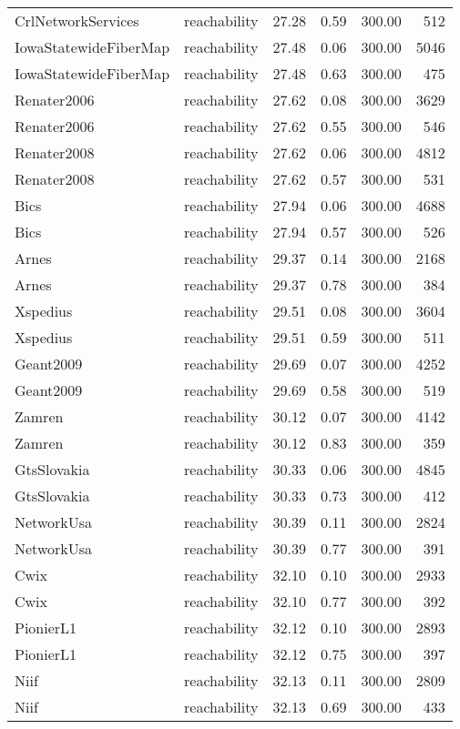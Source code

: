 \begin{tabular}{llrrrr}
CrlNetworkServices & reachability & 27.28 & 0.59 & 300.00 & 512 \\
IowaStatewideFiberMap & reachability & 27.48 & 0.06 & 300.00 & 5046 \\
IowaStatewideFiberMap & reachability & 27.48 & 0.63 & 300.00 & 475 \\
Renater2006 & reachability & 27.62 & 0.08 & 300.00 & 3629 \\
Renater2006 & reachability & 27.62 & 0.55 & 300.00 & 546 \\
Renater2008 & reachability & 27.62 & 0.06 & 300.00 & 4812 \\
Renater2008 & reachability & 27.62 & 0.57 & 300.00 & 531 \\
Bics & reachability & 27.94 & 0.06 & 300.00 & 4688 \\
Bics & reachability & 27.94 & 0.57 & 300.00 & 526 \\
Arnes & reachability & 29.37 & 0.14 & 300.00 & 2168 \\
Arnes & reachability & 29.37 & 0.78 & 300.00 & 384 \\
Xspedius & reachability & 29.51 & 0.08 & 300.00 & 3604 \\
Xspedius & reachability & 29.51 & 0.59 & 300.00 & 511 \\
Geant2009 & reachability & 29.69 & 0.07 & 300.00 & 4252 \\
Geant2009 & reachability & 29.69 & 0.58 & 300.00 & 519 \\
Zamren & reachability & 30.12 & 0.07 & 300.00 & 4142 \\
Zamren & reachability & 30.12 & 0.83 & 300.00 & 359 \\
GtsSlovakia & reachability & 30.33 & 0.06 & 300.00 & 4845 \\
GtsSlovakia & reachability & 30.33 & 0.73 & 300.00 & 412 \\
NetworkUsa & reachability & 30.39 & 0.11 & 300.00 & 2824 \\
NetworkUsa & reachability & 30.39 & 0.77 & 300.00 & 391 \\
Cwix & reachability & 32.10 & 0.10 & 300.00 & 2933 \\
Cwix & reachability & 32.10 & 0.77 & 300.00 & 392 \\
PionierL1 & reachability & 32.12 & 0.10 & 300.00 & 2893 \\
PionierL1 & reachability & 32.12 & 0.75 & 300.00 & 397 \\
Niif & reachability & 32.13 & 0.11 & 300.00 & 2809 \\
Niif & reachability & 32.13 & 0.69 & 300.00 & 433 \\

\end{tabular}
